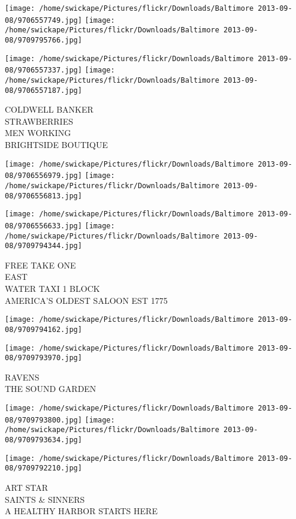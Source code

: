 \documentclass[10pt,letterpaper]{article}
\begin{document}
\texttt{[image: /home/swickape/Pictures/flickr/Downloads/Baltimore 2013-09-08/9706557749.jpg]}
\texttt{[image: /home/swickape/Pictures/flickr/Downloads/Baltimore 2013-09-08/9709795766.jpg]}

\texttt{[image: /home/swickape/Pictures/flickr/Downloads/Baltimore 2013-09-08/9706557337.jpg]}
\texttt{[image: /home/swickape/Pictures/flickr/Downloads/Baltimore 2013-09-08/9706557187.jpg]}

COLDWELL BANKER\\
STRAWBERRIES\\
MEN WORKING\\
BRIGHTSIDE BOUTIQUE
\pagebreak

\texttt{[image: /home/swickape/Pictures/flickr/Downloads/Baltimore 2013-09-08/9706556979.jpg]}
\texttt{[image: /home/swickape/Pictures/flickr/Downloads/Baltimore 2013-09-08/9706556813.jpg]}

\texttt{[image: /home/swickape/Pictures/flickr/Downloads/Baltimore 2013-09-08/9706556633.jpg]}
\texttt{[image: /home/swickape/Pictures/flickr/Downloads/Baltimore 2013-09-08/9709794344.jpg]}

FREE TAKE ONE\\
EAST\\
WATER TAXI 1 BLOCK\\
AMERICA'S OLDEST SALOON EST 1775
\pagebreak

\texttt{[image: /home/swickape/Pictures/flickr/Downloads/Baltimore 2013-09-08/9709794162.jpg]}

\vspace{0.25in}
\texttt{[image: /home/swickape/Pictures/flickr/Downloads/Baltimore 2013-09-08/9709793970.jpg]}

RAVENS\\
THE SOUND GARDEN
\pagebreak

\texttt{[image: /home/swickape/Pictures/flickr/Downloads/Baltimore 2013-09-08/9709793800.jpg]}
\texttt{[image: /home/swickape/Pictures/flickr/Downloads/Baltimore 2013-09-08/9709793634.jpg]}

\vspace{0.25in}
\texttt{[image: /home/swickape/Pictures/flickr/Downloads/Baltimore 2013-09-08/9709792210.jpg]}

ART STAR\\
SAINTS \& SINNERS\\
A HEALTHY HARBOR STARTS HERE
\pagebreak
\end{document}

